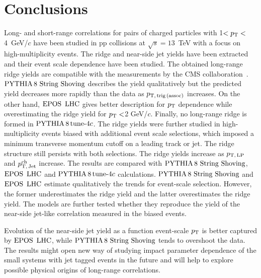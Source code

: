 
\section{Conclusions}
\label{sec:summary}

Long- and short-range correlations for pairs of charged particles with 1$ < p_\mathrm{T} < $4~GeV/$c$ have been studied in pp collisions at $\sqrt{s} = 13$~TeV with a focus on high-multiplicity events. The ridge and near-side jet yields have been extracted and their event scale dependence have been studied. The obtained long-range ridge yields are compatible with the measurements by the CMS collaboration~\cite{Khachatryan:2015lva}.
${\mathrm{PYTHIA}\,8~\mathrm{String}~}\mathrm{Shoving}$ describes the yield qualitatively but the predicted yield decreases more rapidly than the data as $p_\mathrm{T,\,trig\,(assoc)}$ increases. On the other hand, ${\mathrm{EPOS}\,~\mathrm{LHC}}$ gives better description for $p_\mathrm{T}$ dependence while overestimating the ridge yield for $p_\mathrm{T}<$2 GeV/$c$. Finally, no long-range ridge is formed in $\mathrm{PYTHIA}\,8\,\mathrm{tune}{\text -}4c$.
The ridge yields were further studied in high-multiplicity events biased with additional event scale selections, which imposed a minimum transverse momentum cutoff on a leading track or jet. The ridge structure still persists with both selections. The ridge yields increase as $p_\mathrm{T,\,LP}$ and $p_\mathrm{T,\,Jet}^\mathrm{ch}$ increase. The results are compared with ${\mathrm{PYTHIA}\,8~\mathrm{String}~}\mathrm{Shoving}$, ${\mathrm{EPOS}\,~\mathrm{LHC}}$ and $\mathrm{PYTHIA}\,8\,\mathrm{tune}{\text -}4c$ calculations. ${\mathrm{PYTHIA}\,8~\mathrm{String}~}\mathrm{Shoving}$ and ${\mathrm{EPOS}\,~\mathrm{LHC}}$ estimate qualitatively the trends for event-scale selection. However, the former underestimates the ridge yield and the latter overestimates the ridge yield. The models are further tested whether they reproduce the yield of the near-side jet-like correlation measured in the biased events.

Evolution of the near-side jet yield as a function event-scale $p_\mathrm{T}$ is better captured by ${\mathrm{EPOS}\,~\mathrm{LHC}}$, while ${\mathrm{PYTHIA}\,8~\mathrm{String}~}\mathrm{Shoving}$ tends to overshoot the data. 
The results might open new way of studying impact parameter dependence of the small systems with jet tagged events in the future and will help to explore possible physical origins of long-range correlations.

